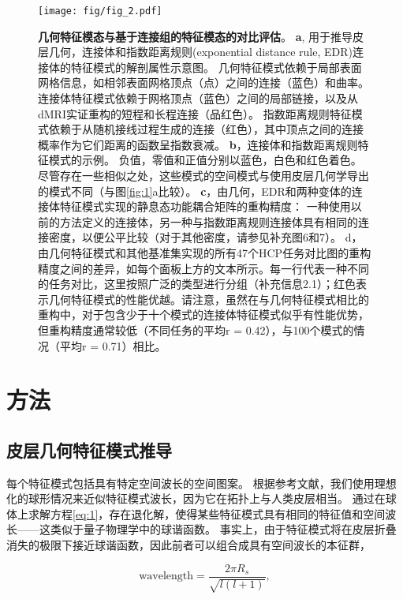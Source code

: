 \documentclass[lang=cn,a4paper,newtx]{elegantpaper}
\begin{document}
\begin{figure}[!htb]
	\centering
	\texttt{[image: fig/fig\_2.pdf]}
	\caption{\textbf{几何特征模态与基于连接组的特征模态的对比评估}。
		\textbf{a}, 用于推导皮层几何，连接体和指数距离规则(exponential distance rule, EDR)连接体的特征模式的解剖属性示意图。
		几何特征模式依赖于局部表面网格信息，如相邻表面网格顶点（点）之间的连接（蓝色）和曲率。
		连接体特征模式依赖于网格顶点（蓝色）之间的局部链接，以及从dMRI实证重构的短程和长程连接（品红色）。
		指数距离规则特征模式依赖于从随机接线过程生成的连接（红色），其中顶点之间的连接概率作为它们距离的函数呈指数衰减。
		\textbf{b}，连接体和指数距离规则特征模式的示例。
		负值，零值和正值分别以蓝色，白色和红色着色。
		尽管存在一些相似之处，这些模式的空间模式与使用皮层几何学导出的模式不同（与图\ref{fig:1}a比较）。
		\textbf{c}，由几何，EDR和两种变体的连接体特征模式实现的静息态功能耦合矩阵的重构精度：
		一种使用以前的方法\cite{naze2021robustness}定义的连接体，另一种与指数距离规则连接体具有相同的连接密度，以便公平比较（对于其他密度，请参见补充图6和7）。
		d，由几何特征模式和其他基准集实现的所有47个HCP任务对比图的重构精度之间的差异，如每个面板上方的文本所示。每一行代表一种不同的任务对比，这里按照广泛的类型进行分组（补充信息2.1）；红色表示几何特征模式的性能优越。请注意，虽然在与几何特征模式相比的重构中，对于包含少于十个模式的连接体特征模式似乎有性能优势，但重构精度通常较低（不同任务的平均r = 0.42），与100个模式的情况（平均r = 0.71）相比。
	} \label{fig:2}
\end{figure}




\section{方法} \label{sec:method}

\subsection{皮层几何特征模式推导} \label{sec:derivation}

每个特征模式包括具有特定空间波长的空间图案。
根据参考文献\cite{robinson2016eigenmodes}，我们使用理想化的球形情况来近似特征模式波长，因为它在拓扑上与人类皮层相当。
通过在球体上求解方程\ref{eq:1}，存在退化解，使得某些特征模式具有相同的特征值和空间波长——这类似于量子物理学中的球谐函数。
事实上，由于特征模式将在皮层折叠消失的极限下接近球谐函数，因此前者可以组合成具有空间波长的本征群，

\begin{equation}
	\text{wavelength} = \frac{2 \pi R_s}{\sqrt{l(l+1)}},
\end{equation}
\end{document}
